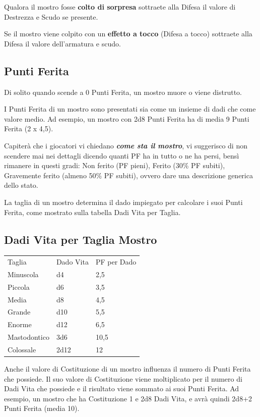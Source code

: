 \begin{multicols}{2}
	Qualora il mostro fosse \textbf{colto di sorpresa} sottraete alla Difesa il valore di Destrezza e Scudo se presente.

	Se il mostro viene colpito con un \textbf{effetto a tocco} (Difesa a tocco) sottraete alla Difesa il valore dell'armatura e scudo.

	\subsection{Punti Ferita}

	Di solito quando scende a 0 Punti Ferita, un mostro muore o viene distrutto.

	I Punti Ferita di un mostro sono presentati sia come un insieme di dadi che come valore medio. Ad esempio, un mostro con 2d8 Punti Ferita ha di media 9 Punti Ferita (2 x 4,5).

	Capiterà che i giocatori vi chiedano \textbf{\textit{come sta il mostro}}, vi suggerisco di non scendere mai nei dettagli dicendo quanti PF ha in tutto o ne ha persi, bensì rimanere in questi gradi:  Non ferito (PF pieni), Ferito (30\% PF subiti), Gravemente ferito (almeno 50\% PF subiti), ovvero dare una descrizione generica dello stato. 

	La taglia di un mostro determina il dado impiegato per calcolare i suoi Punti Ferita, come mostrato sulla tabella Dadi Vita per Taglia.

	\subsection{Dadi Vita per Taglia Mostro}

	\medskip
	\begin{tabular}{lll}
		\toprule
		Taglia & Dado Vita & PF per Dado\\
		Minuscola &d4&2,5\\
		Piccola &d6&3,5\\
		Media&d8 &4,5\\
		Grande&d10&5,5\\
		Enorme&d12&6,5\\
		Mastodontico&3d6&10,5\\
		Colossale&2d12&12\\
	\end{tabular}
	\medskip

	Anche il valore di Costituzione di un mostro influenza il numero di Punti Ferita che possiede. Il suo valore di Costituzione viene moltiplicato per il numero di Dadi Vita che possiede e il risultato viene sommato ai suoi Punti Ferita. Ad esempio, un mostro che ha Costituzione 1 e 2d8 Dadi Vita, e avrà quindi 2d8+2 Punti Ferita (media 10).


\end{multicols}

